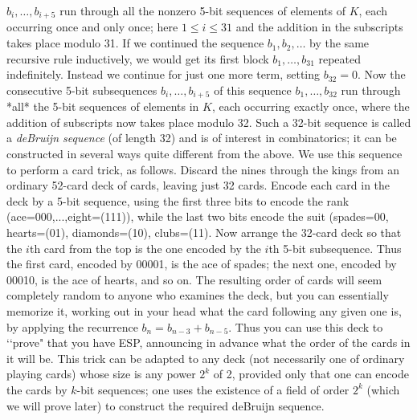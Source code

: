 $b_i,\ldots,b_{i+5}$ run through all the nonzero 5-bit sequences of elements of $K$, each occurring once and only once; here $1\le i\le 31$ and the addition in the subscripts takes place modulo 31.  If we continued the sequence $b_1,b_2,\ldots$ by the same recursive rule inductively, we would get its first block $b_1,\ldots,b_{31}$ repeated indefinitely.  Instead we continue for just one more term, setting $b_{32}= 0$.  Now the consecutive 5-bit subsequences $b_i,\ldots,b_{i+5}$ of this sequence $b_1,\ldots,b_{32}$ run through *all* the 5-bit sequences of elements in $K$, each occurring exactly once, where the addition of subscripts now takes place modulo 32.  Such a 32-bit sequence is called a {\sl deBruijn sequence} (of length 32) and is of interest in combinatorics; it can be constructed in several ways quite different from the above.  We use this sequence to perform a card trick, as follows.  Discard the nines through the kings from an ordinary 52-card deck of cards, leaving just 32 cards.  Encode each card in the deck by a 5-bit sequence, using the first three bits to encode the rank (ace=000,...,eight=(111)), while the last two bits encode the suit (spades=00, hearts=(01), diamonds=(10), clubs=(11).  Now arrange the 32-card deck so that the $i$th card from the top is the one encoded by the $i$th 5-bit subsequence.  Thus the first card, encoded by 00001, is the ace of spades; the next one, encoded by 00010, is the ace of hearts, and so on.  The resulting order of cards will seem completely random to anyone who examines the deck, but you can essentially memorize it, working out in your head what the card following any given one is, by applying the recurrence $b_n = b_{n-3} + b_{n-5}$.  Thus you can use this deck to \lq\lq prove" that you have ESP, announcing in advance what the order of the cards in it will be.  This trick can be adapted to any deck (not necessarily one of ordinary playing cards) whose size is any power $2^k$ of 2, provided only that one can encode the cards by $k$-bit sequences; one uses the existence of a field of order $2^k$ (which we will prove later) to construct the required deBruijn sequence.  

